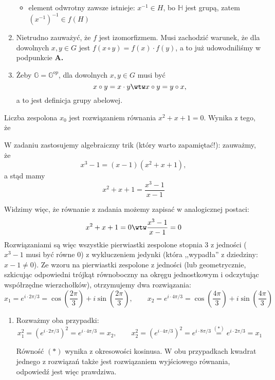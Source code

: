 \begin{solutions}
\begin{enumerate}[\bf A.]
\begin{itemize}
                \item element odwrotny zawsze istnieje: $x^{-1} \in H$, bo $\mathbb{H}$ jest grupą, zatem $(x^{-1})^{-1} \in f(H)$
            \end{itemize}

        \item Nietrudno zauważyć, że $f$ jest izomorfizmem.
        Musi zachodzić warunek, że dla dowolnych $x, y \in G$ jest $f(x \circ y) = 
        f(x) \cdot f(y)$, a to już udowodniliśmy w podpunkcie \textbf{A.}
    
        \item Żeby $\mathbb{G}=\mathbb{G}^{op}$, dla dowolnych $x, y \in G$ musi być $$x \circ y = x \cdot y \wtw x \circ y = y \circ x,$$ a to jest definicja grupy abelowej.
    \end{enumerate}

    \sol Liczba zespolona $x_0$ jest rozwiązaniem równania $x^2 + x + 1 = 0$. Wynika z tego, że

    W zadaniu zastosujemy algebraiczny trik (który warto zapamiętać!): zauważmy, że
    $$x^3 - 1 = (x - 1)(x^2 + x + 1),$$
    a stąd mamy
    $$x^2 + x + 1 = \frac{x^3 - 1}{x - 1}$$
    
    Widzimy więc, że równanie z zadania możemy zapisać w analogicznej postaci:
    $$x^2 + x + 1 = 0 \wtw \frac{x^3 - 1}{x - 1} = 0$$
    Rozwiązaniami są więc wszystkie pierwiastki zespolone stopnia 3 z jedności ($x^3 - 1$ musi być równe 0) z wykluczeniem jedynki (która ,,wypadła'' z dziedziny: $x - 1 \neq 0$). Ze wzoru na pierwiastki zespolone z jedności (lub geometrycznie, szkicując odpowiedni trójkąt równoboczny na okręgu jednostkowym i odczytując współrzędne wierzchołków), otrzymujemy dwa rozwiązania:
    $$x_1 = e^{i \cdot 2\pi/3} = \cos\left(\frac{2\pi}{3}\right) + i \sin\left(\frac{2\pi}{3}\right), \qquad x_2 = e^{i \cdot 4\pi/3} = \cos\left(\frac{4\pi}{3}\right) + i \sin\left(\frac{4\pi}{3}\right)$$
    
    \begin{enumerate}[\bf A.]
    	\item Rozważmy oba przypadki:
    	$$x_1^2 = (e^{i \cdot 2\pi/3})^2 = e^{i \cdot 4\pi/3} = x_2, \qquad x_2^2 = (e^{i \cdot 4\pi/3})^2 = e^{i \cdot 8\pi/3} \overset{(*)}{=} e^{i \cdot 2\pi/3} = x_1$$
    	
    	Równość $(*)$ wynika z okresowości kosinusa. W obu przypadkach kwadrat jednego z rozwiązań także jest rozwiązaniem wyjściowego równania, odpowiedź jest więc prawdziwa.
    	

\end{enumerate}
\end{solutions}
